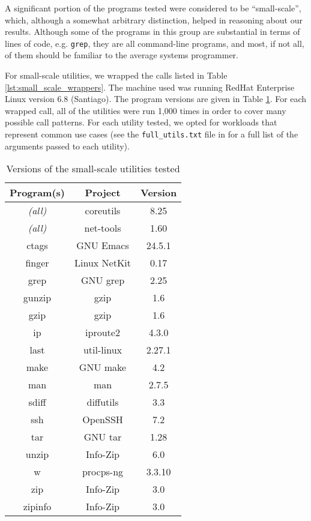 A significant portion of the programs tested were considered to be ``small-scale'', which, although a somewhat arbitrary distinction, helped in reasoning about our results. Although some of the programs in this group are substantial in terms of lines of code, e.g. \texttt{grep}, they are all command-line programs, and most, if not all, of them should be familiar to the average systems programmer.

For small-scale utilities, we wrapped the calls listed in Table \ref{lst:small_scale_wrappers}. The machine used was running RedHat Enterprise Linux version 6.8 (Santiago). The program versions are given in Table \ref{tab:small_scale_versions}. For each wrapped call, all of the utilities were run 1,000 times in order to cover many possible call patterns. For each utility tested, we opted for workloads that represent common use cases (see the \texttt{full\_utils.txt} file in \cite{github} for a full list of the arguments passed to each utility).

\begin{table}[h!]
\begin{center}
\begin{tabular}{ |c|c|c| }
\hline
\multicolumn{1}{|c|}{\textbf{Program(s)}} & \multicolumn{1}{c|}{\textbf{Project}} & \multicolumn{1}{c|}{\textbf{Version}} \\
\hline
\em{(all)} & coreutils  & 8.25 \\ 
\em{(all)} & net-tools & 1.60 \\
ctags&GNU Emacs & 24.5.1 \\
finger&Linux NetKit  & 0.17 \\
grep & GNU grep & 2.25 \\
gunzip & gzip & 1.6 \\
gzip & gzip & 1.6 \\
ip&iproute2 & 4.3.0 \\
last & util-linux & 2.27.1 \\
make & GNU make & 4.2 \\
man & man & 2.7.5 \\
sdiff&diffutils & 3.3 \\
ssh&OpenSSH & 7.2 \\
tar&GNU tar & 1.28 \\
unzip&Info-Zip  & 6.0 \\
w&procps-ng & 3.3.10 \\
zip&Info-Zip & 3.0 \\
zipinfo&Info-Zip & 3.0 \\
\hline
\end{tabular}
\caption{Versions of the small-scale utilities tested}
\label{tab:small_scale_versions}
\end{center}
\end{table}

